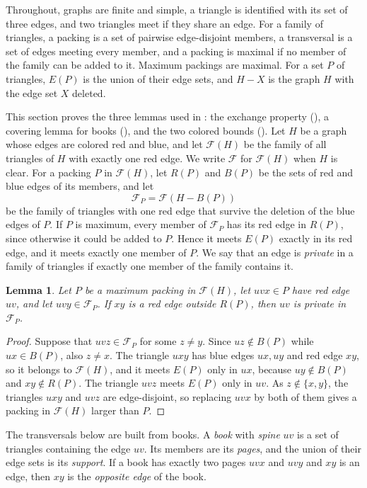 \documentclass[11pt]{article}
\newtheorem{lemma}{Lemma}[section]
\theoremstyle{remark}
\newcommand{\F}{\mathcal F}
\begin{document}
Throughout, graphs are finite and simple, a triangle is identified with its set of three edges, and two triangles meet if they share an edge. For a family of triangles, a packing is a set of pairwise edge-disjoint members, a transversal is a set of edges meeting every member, and a packing is maximal if no member of the family can be added to it. Maximum packings are maximal. For a set $P$ of triangles, $E(P)$ is the union of their edge sets, and $H-X$ is the graph $H$ with the edge set $X$ deleted.

This section proves the three lemmas used in : the exchange property (), a covering lemma for books (), and the two colored bounds (). Let $H$ be a graph whose edges are colored red and blue, and let $\F(H)$ be the family of all triangles of $H$ with exactly one red edge. We write $\F$ for $\F(H)$ when $H$ is clear. For a packing $P$ in $\F(H)$, let $R(P)$ and $B(P)$ be the sets of red and blue edges of its members, and let
\[
 \F_P=\F(H-B(P))
\]
be the family of triangles with one red edge that survive the deletion of the blue edges of $P$. If $P$ is maximum, every member of $\F_P$ has its red edge in $R(P)$, since otherwise it could be added to $P$. Hence it meets $E(P)$ exactly in its red edge, and it meets exactly one member of $P$. We say that an edge is \emph{private} in a family of triangles if exactly one member of the family contains it.

\begin{lemma}\label{lem:unique}
Let $P$ be a maximum packing in $\F(H)$, let $uvx\in P$ have red edge $uv$, and let $uvy\in\F_P$. If $xy$ is a red edge outside $R(P)$, then $uv$ is private in $\F_P$.
\end{lemma}

\begin{proof}
Suppose that $uvz\in\F_P$ for some $z\ne y$. Since $uz\notin B(P)$ while $ux\in B(P)$, also $z\ne x$. The triangle $uxy$ has blue edges $ux,uy$ and red edge $xy$, so it belongs to $\F(H)$, and it meets $E(P)$ only in $ux$, because $uy\notin B(P)$ and $xy\notin R(P)$. The triangle $uvz$ meets $E(P)$ only in $uv$. As $z\notin\{x,y\}$, the triangles $uxy$ and $uvz$ are edge-disjoint, so replacing $uvx$ by both of them gives a packing in $\F(H)$ larger than $P$.
\end{proof}

The transversals below are built from books. A \emph{book} with \emph{spine} $uv$ is a set of triangles containing the edge $uv$. Its members are its \emph{pages}, and the union of their edge sets is its \emph{support}. If a book has exactly two pages $uvx$ and $uvy$ and $xy$ is an edge, then $xy$ is the \emph{opposite edge} of the book.
\end{document}
